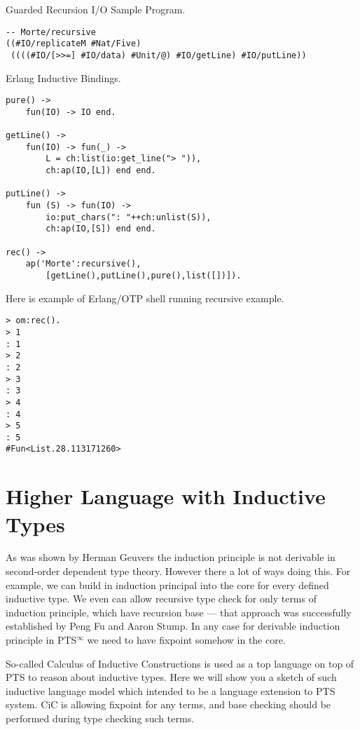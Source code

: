 \documentclass{article}
\begin{document}
Guarded Recursion I/O Sample Program.

\begin{lstlisting}[mathescape=true]
-- Morte/recursive
((#IO/replicateM #Nat/Five)
 ((((#IO/[>>=] #IO/data) #Unit/@) #IO/getLine) #IO/putLine))
\end{lstlisting}

Erlang Inductive Bindings.

\begin{lstlisting}[mathescape=true]
pure() ->
    fun(IO) -> IO end.

getLine() ->
    fun(IO) -> fun(_) ->
        L = ch:list(io:get_line("> ")),
        ch:ap(IO,[L]) end end.

putLine() ->
    fun (S) -> fun(IO) ->
        io:put_chars(": "++ch:unlist(S)),
        ch:ap(IO,[S]) end end.

rec() ->
    ap('Morte':recursive(),
        [getLine(),putLine(),pure(),list([])]).
\end{lstlisting}


Here is example of Erlang/OTP shell running recursive example.

\begin{lstlisting}[mathescape=true]
> om:rec().
> 1
: 1
> 2
: 2
> 3
: 3
> 4
: 4
> 5
: 5
#Fun<List.28.113171260>
\end{lstlisting}

\section{Higher Language with Inductive Types}
As was shown by Herman Geuvers\cite{Geuvers01} the induction principle is not derivable in second-order dependent type theory.
However there a lot of ways doing this. For example, we can build in induction principal into the core for every defined inductive type.
We even can allow recursive type check for only terms of induction principle, which have recursion base --- that approach was successfully established by Peng Fu and Aaron Stump\cite{Stump17}.
In any case for derivable induction principle in PTS$^\infty$ we need to have fixpoint somehow in the core.

So-called Calculus of Inductive Constructions\cite{Mohring15} is used as a top language on top of PTS to reason about inductive types.
Here we will show you a sketch of such inductive language model which intended to be a language extension to PTS system.
CiC is allowing fixpoint for any terms, and base checking should be performed during type checking such terms.
\end{document}
